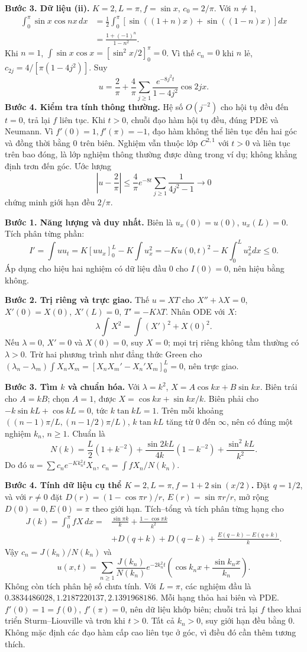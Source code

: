 \textbf{Bước 3. Dữ liệu (ii).} $K=2,L=\pi,f=\sin x$, $c_0=2/\pi$. Với $n\ne1$,
\begin{align*}
\int_0^\pi\sin x\cos nx\,dx
&=\frac12\int_0^\pi[\sin((1+n)x)+\sin((1-n)x)]dx\\
&=\frac{1+(-1)^n}{1-n^2}.
\end{align*}
Khi $n=1$, $\int\sin x\cos x=[\sin^2x/2]_0^\pi=0$. Vì thế $c_n=0$ khi $n$ lẻ, $c_{2j}=4/[\pi(1-4j^2)]$. Suy
\[u=\frac2\pi+\frac4\pi\sum_{j\ge1}\frac{e^{-8j^2t}}{1-4j^2}\cos2jx.\]
\textbf{Bước 4. Kiểm tra tính thông thường.} Hệ số $O(j^{-2})$ cho hội tụ đều đến $t=0$, trả lại $f$ liên tục. Khi $t>0$, chuỗi đạo hàm hội tụ đều, đúng PDE và Neumann. Vì $f'(0)=1,f'(\pi)=-1$, đạo hàm không thể liên tục đến hai góc và đồng thời bằng $0$ trên biên. Nghiệm vẫn thuộc lớp $C^{2,1}$ với $t>0$ và liên tục trên bao đóng, là lớp nghiệm thông thường được dùng trong ví dụ; không khẳng định trơn đến góc. Ước lượng
\[\left|u-\frac2\pi\right|\le\frac4\pi e^{-8t}\sum_{j\ge1}\frac1{4j^2-1}\longrightarrow0\]
chứng minh giới hạn đều $2/\pi$.

\textbf{Bước 1. Năng lượng và duy nhất.} Biên là $u_x(0)=u(0)$, $u_x(L)=0$. Tích phân từng phần:
\[I'=\int uu_t=K[uu_x]_0^L-K\int u_x^2
=-K u(0,t)^2-K\int_0^Lu_x^2dx\le0.\]
Áp dụng cho hiệu hai nghiệm có dữ liệu đầu $0$ cho $I(0)=0$, nên hiệu bằng không.

\textbf{Bước 2. Trị riêng và trực giao.} Thế $u=XT$ cho $X''+\lambda X=0$, $X'(0)=X(0)$, $X'(L)=0$, $T'=-K\lambda T$. Nhân ODE với $X$:
\[\lambda\int X^2=\int(X')^2+X(0)^2.\]
Nếu $\lambda=0$, $X'=0$ và $X(0)=0$, suy $X=0$; mọi trị riêng không tầm thường có $\lambda>0$. Trừ hai phương trình như đẳng thức Green cho $(\lambda_n-\lambda_m)\int X_nX_m=[X_nX_m'-X_n'X_m]_0^L=0$, nên trực giao.

\textbf{Bước 3. Tìm $k$ và chuẩn hóa.} Với $\lambda=k^2$, $X=A\cos kx+B\sin kx$. Biên trái cho $A=kB$; chọn $A=1$, được $X=\cos kx+\sin kx/k$. Biên phải cho $-k\sin kL+\cos kL=0$, tức $k\tan kL=1$. Trên mỗi khoảng $((n-1)\pi/L,(n-1/2)\pi/L)$, $k\tan kL$ tăng từ $0$ đến $\infty$, nên có đúng một nghiệm $k_n$, $n\ge1$. Chuẩn là
\[N(k)=\frac L2(1+k^{-2})+\frac{\sin2kL}{4k}(1-k^{-2})+\frac{\sin^2kL}{k^2}.\]
Do đó $u=\sum c_ne^{-Kk_n^2t}X_n$, $c_n=\int fX_n/N(k_n)$.

\textbf{Bước 4. Tính dữ liệu cụ thể $K=2,L=\pi,f=1+2\sin(x/2)$.}
Đặt $q=1/2$, và với $r\ne0$ đặt $D(r)=(1-\cos\pi r)/r$, $E(r)=\sin\pi r/r$, mở rộng $D(0)=0,E(0)=\pi$ theo giới hạn. Tích–tổng và tích phân từng hạng cho
\begin{align*}
J(k)=\int_0^\pi fX\,dx
={}&\frac{\sin\pi k}{k}+\frac{1-\cos\pi k}{k^2}\\
&+D(q+k)+D(q-k)+\frac{E(q-k)-E(q+k)}k.
\end{align*}
Vậy $c_n=J(k_n)/N(k_n)$ và
\[u(x,t)=\sum_{n\ge1}\frac{J(k_n)}{N(k_n)}e^{-2k_n^2t}
\left(\cos k_nx+\frac{\sin k_nx}{k_n}\right).\]
Không còn tích phân hệ số chưa tính. Với $L=\pi$, các nghiệm đầu là $0.3834486028,1.2187220137,2.1391968186$. Mỗi hạng thỏa hai biên và PDE. $f'(0)=1=f(0)$, $f'(\pi)=0$, nên dữ liệu khớp biên; chuỗi trả lại $f$ theo khai triển Sturm–Liouville và trơn khi $t>0$. Tất cả $k_n>0$, suy giới hạn đều bằng $0$. Không mặc định các đạo hàm cấp cao liên tục ở góc, vì điều đó cần thêm tương thích.

